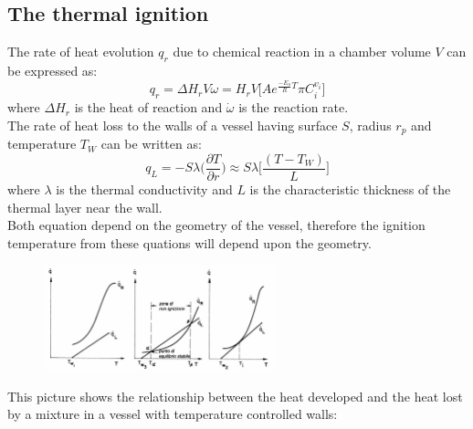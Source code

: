 \documentclass[12pt]{article}
\begin{document}
\subsection{The thermal ignition}

The rate of heat evolution $q_{r}$ due to chemical reaction in a chamber volume $V$ can be expressed as:
\begin{equation}
    q_{r}=\Delta H_{r} V \dot{\omega} = H_{r} V \bigg[Ae^{\frac{-E_{a}}{R}T} \pi C_{i}^{v_{i}}\bigg]
\end{equation}
where $\Delta H_{r}$ is the heat of reaction and $\dot{\omega}$ is the reaction rate.\\
The rate of heat loss to the walls of a vessel having surface $S$, radius $r_{p}$ and temperature $T_{W}$ can be written as:
\begin{equation}
    q_{L} = -S \lambda \bigg(\frac{\partial T}{\partial r}\bigg) \approx S \lambda\bigg[\frac {(T-T_{W})}{L}\bigg]
\end{equation}
where $\lambda$ is the thermal conductivity and $L$ is the characteristic thickness of the thermal layer near the wall.\\
Both equation depend on the geometry of the vessel, therefore the ignition temperature from these quations will depend upon the geometry.

\begin{figure}[!ht]
\centering
\includegraphics[width=0.6\textwidth]{figures/thermallossgain.png}
\end{figure}

This picture shows the relationship between the heat developed and the heat lost by a mixture in a vessel with temperature controlled walls:
\end{document}
